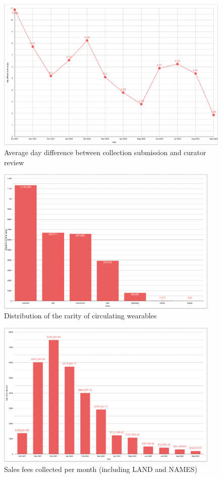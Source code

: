 \documentclass[MSE,Master,english]{twbook}%
\begin{document}
\begin{figure}[H]
  \centering
  \includegraphics[width=\textwidth]{metrics/day_difference.png}
  \caption{Average day difference between collection submission and curator review}
  \label{fig:day_difference}
\end{figure}
\begin{figure}[H]
  \centering
  \includegraphics[width=0.95\textwidth]{metrics/rarity_distribution.png}
  \caption{Distribution of the rarity of circulating wearables}
  \label{fig:rarity_distribution}
\end{figure}
\begin{figure}[H]
  \centering
  \includegraphics[width=0.95\textwidth]{metrics/sales_fees.png}
  \caption{Sales fees collected per month (including LAND and NAMES)}
  \label{fig:sales_fees}
\end{figure}
\end{document}

